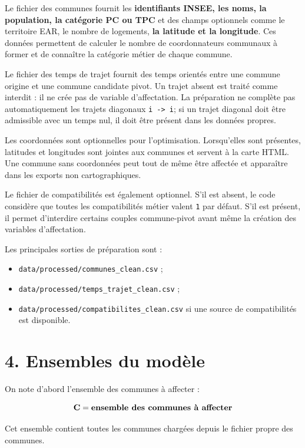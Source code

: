 \documentclass[11pt,a4paper]{article}
\begin{document}
Le fichier des communes fournit les \textbf{identifiants INSEE, les noms, la population, la catégorie PC ou TPC} et des champs optionnels comme le territoire EAR, le nombre de logements, \textbf{la latitude et la longitude}. Ces données permettent de calculer le nombre de coordonnateurs communaux à former et de connaître la catégorie métier de chaque commune.

Le fichier des temps de trajet fournit des temps orientés entre une commune origine et une commune candidate pivot. Un trajet absent est traité comme interdit : il ne crée pas de variable d'affectation. La préparation ne complète pas automatiquement les trajets diagonaux \texttt{i -> i}; si un trajet diagonal doit être admissible avec un temps nul, il doit être présent dans les données propres.

Les coordonnées sont optionnelles pour l'optimisation. Lorsqu'elles sont présentes, latitudes et longitudes sont jointes aux communes et servent à la carte HTML. Une commune sans coordonnées peut tout de même être affectée et apparaître dans les exports non cartographiques.

Le fichier de compatibilités est également optionnel. S'il est absent, le code considère que toutes les compatibilités métier valent \texttt{1} par défaut. S'il est présent, il permet d'interdire certains couples commune-pivot avant même la création des variables d'affectation.

Les principales sorties de préparation sont :

\begin{itemize}
\item \texttt{data/processed/communes\_clean.csv} ;
\item \texttt{data/processed/temps\_trajet\_clean.csv} ;
\item \texttt{data/processed/compatibilites\_clean.csv} si une source de compatibilités est
disponible.

\end{itemize}

\newpage
\section{4. Ensembles du modèle}

On note d'abord l'ensemble des communes à affecter :

\[\mathbf{C} = \text{\textbf{ensemble des communes à affecter}}\]

Cet ensemble contient toutes les communes chargées depuis le fichier propre des communes.
\end{document}

